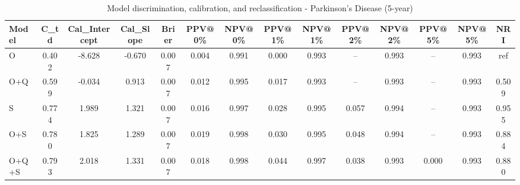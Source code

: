 \begin{table}[htbp]
\centering
\small
\caption{Model discrimination, calibration, and reclassification - Parkinson's Disease (5-year)}
\label{tab:perf_pd_5y}
\begin{tabular}{lccccccccccccc}
\toprule
Model & C\_td & Cal\_Intercept & Cal\_Slope & Brier & PPV@0\% & NPV@0\% & PPV@1\% & NPV@1\% & PPV@2\% & NPV@2\% & PPV@5\% & NPV@5\% & NRI \\
\midrule
O & 0.402 & -8.628 & -0.670 & 0.007 & 0.004 & 0.991 & 0.000 & 0.993 & -- & 0.993 & -- & 0.993 & ref \\
O+Q & 0.599 & -0.034 & 0.913 & 0.007 & 0.012 & 0.995 & 0.017 & 0.993 & -- & 0.993 & -- & 0.993 & 0.509 \\
S & 0.774 & 1.989 & 1.321 & 0.007 & 0.016 & 0.997 & 0.028 & 0.995 & 0.057 & 0.994 & -- & 0.993 & 0.955 \\
O+S & 0.780 & 1.825 & 1.289 & 0.007 & 0.019 & 0.998 & 0.030 & 0.995 & 0.048 & 0.994 & -- & 0.993 & 0.884 \\
O+Q+S & 0.793 & 2.018 & 1.331 & 0.007 & 0.018 & 0.998 & 0.044 & 0.997 & 0.038 & 0.993 & 0.000 & 0.993 & 0.880 \\
\bottomrule
\end{tabular}
\end{table}